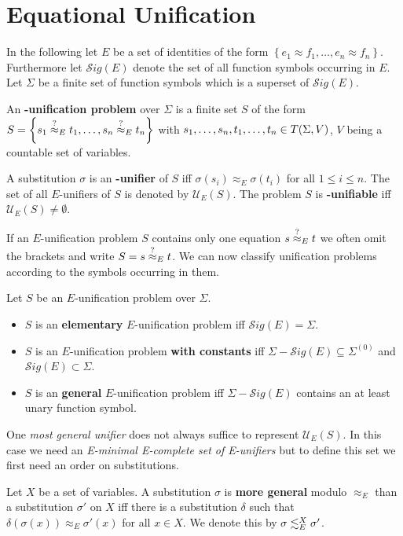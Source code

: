 \section{Equational Unification}
In the following let $E$ be a set of identities of the form $\left\lbrace  e_1\approx f_1,\dots,e_n\approx f_n \right\rbrace$. Furthermore let $\mathcal{S}ig(E)$ denote the set of all function symbols occurring in $E$. Let $\Sigma$ be a finite set of function symbols which is a superset of $\mathcal{S}ig(E)$.
\begin{definition}
	An \textbf{\mBold-unification problem} over $\Sigma$ is a finite set $S$ of the form $S=\left\lbrace s_1\stackrel{?}{\approx}_{E} t_1,\dots,s_n\stackrel{?}{\approx}_{E} t_n\right\rbrace $ with $s_1,\dots,s_n,t_1,\dots,t_n \in T(\Sigma,V)$, $V$ being a countable set of variables.
	
	A substitution $\sigma$ is an \textbf{\mBold-unifier} of $S$ iff $ \sigma(s_i)\approx_E \sigma(t_i)$ for all $1\leq i \leq n$.
	The set of all $E$-unifiers of $S$ is denoted by $\mathcal{U}_E(S)$. The problem $S$ is \textbf{\mBold-unifiable} iff $\mathcal{U}_E(S)\neq \emptyset$.
\end{definition}
If an $E$-unification problem $S$ contains only one equation $s\stackrel{?}{\approx}_E t$ we often omit the brackets and write $S=s\stackrel{?}{\approx}_E t$. We can now classify unification problems according to the symbols occurring in them.
\begin{definition}
	Let $S$ be an $E$-unification problem over $\Sigma$.
	\begin{itemize}
		\item $S$ is an \textbf{elementary} $E$-unification problem iff $\mathcal{S}ig(E)=\Sigma$.
		\item $S$ is an $E$-unification problem \textbf{with constants} iff $\Sigma-\mathcal{S}ig(E)\subseteq\Sigma^{(0)}$ and $\mathcal{S}ig(E)\subset\Sigma$.
		\item $S$ is an \textbf{general} $E$-unification problem iff $\Sigma-\mathcal{S}ig(E)$ contains an at least unary function symbol.
	\end{itemize}
\end{definition}
One \emph{most general unifier} does not always suffice to represent $\mathcal{U}_E(S)$. In this case we need an \emph{E-minimal E-complete set of E-unifiers} but to define this set we first need an order on substitutions.
\begin{definition}
	Let $X$ be a set of variables. A substitution $\sigma$ is \textbf{more general} modulo $\approx_E$ than a substitution $\sigma'$ on $X$ iff there is a substitution $\delta$ such that $\delta(\sigma(x))\approx_E\sigma'(x)$ for all $x \in X$. We denote this by $\sigma\lesssim^X_E\sigma'$.
\end{definition}
